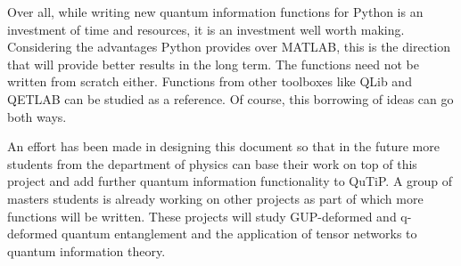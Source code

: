 \par Over all, while writing new quantum information functions for Python is an investment of time and resources, it is an investment well worth making. Considering the advantages Python provides over MATLAB, this is the direction that will provide better results in the long term. The functions need not be written from scratch either. Functions from other toolboxes like QLib and QETLAB can be studied as a reference. Of course, this borrowing of ideas can go both ways.
\par An effort has been made in designing this document so that in the future more students from the department of physics can base their work on top of this project and add further quantum information functionality to QuTiP. A group of masters students is already working on other projects as part of which more functions will be written. These projects will study GUP-deformed and q-deformed quantum entanglement and the application of tensor networks to quantum information theory.

